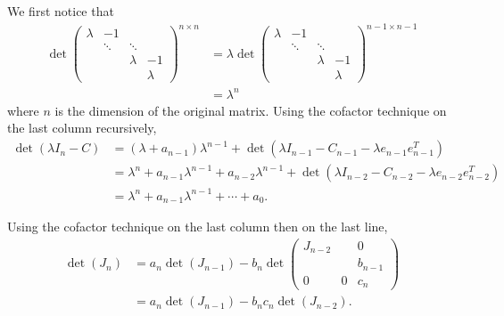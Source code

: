 \begin{solution}
  We first notice that
  \begin{align*}
    \det\begin{pmatrix}
      \lambda & -1 &\\
      & \ddots & \ddots\\
      & & \lambda & -1\\
      & & & \lambda
    \end{pmatrix}^{n \times n}
    & =
    \lambda
    \det\begin{pmatrix}
      \lambda & -1 &\\
              & \ddots & \ddots\\
              & & \lambda & -1\\
              & & & \lambda
    \end{pmatrix}^{n-1 \times n-1} \\
    & = \lambda^n
  \end{align*}
  where $n$ is the dimension of the original matrix.
  Using the cofactor technique on the last column recursively,
  \begin{align*}
    \det(\lambda I_n - C) & = (\lambda + a_{n-1})\lambda^{n-1}
    + \det(\lambda I_{n-1} - C_{n-1} - \lambda e_{n-1}e_{n-1}^T)\\
    & =
    \lambda^n + a_{n-1}\lambda^{n-1}
    + a_{n-2} \lambda^{n-1}
    + \det(\lambda I_{n-2} - C_{n-2} - \lambda e_{n-2}e_{n-2}^T)\\
    & = \lambda^n + a_{n-1}\lambda^{n-1} + \cdots + a_0.
  \end{align*}
\end{solution}

\begin{solution}
  Using the cofactor technique on the last column then on the last line,
  \begin{align*}
    \det(J_n)
    & = a_n\det(J_{n-1}) - b_n
    \det
    \begin{pmatrix}
     J_{n-2}  &   & 0 \\
              &   & b_{n-1} \\
     0        & 0 & c_n
    \end{pmatrix}\\
    & = a_n\det(J_{n-1}) - b_n c_n \det(J_{n-2}).
  \end{align*}
\end{solution}

